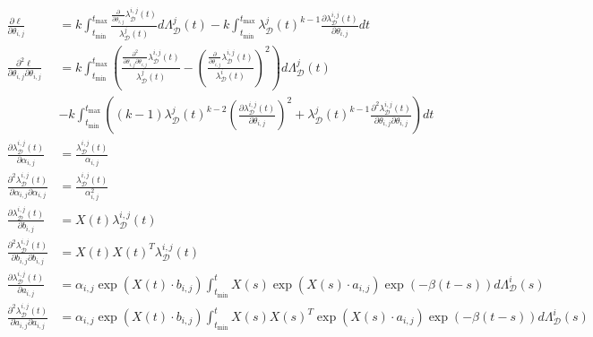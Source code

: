 \documentclass[honours,12pt]{unswthesis}
\numberwithin{equation}{section}
\begin{document}
\begin{equation*}
	\begin{align}
		\frac{\partial\ell}{\partial\theta_{i,j}} &= k\int_{t_\mathrm{min}}^{t_\mathrm{max}} \frac{\frac{\partial}{\partial\theta_{i,j}} \lambda_\mathcal{D}^{i,j}(t)}{\lambda_\mathcal{D}^j(t)}d\Lambda_\mathcal{D}^{j}(t) - k\int_{t_\mathrm{min}}^{t_\mathrm{max}} \lambda_\mathcal{D}^j(t)^{k-1} \frac{\partial \lambda_\mathcal{D}^{i,j}(t)}{\partial \theta_{i,j}} dt \\
		\frac{\partial^2\ell}{\partial\theta_{i,j}\partial\theta_{i,j}} &= k\int_{t_\mathrm{min}}^{t_\mathrm{max}} \left( \frac{\frac{\partial^2}{\partial\theta_{i,j}\partial\theta_{i,j}} \lambda_\mathcal{D}^{i,j}(t)}{\lambda_\mathcal{D}^j(t)} - \left(\frac{\frac{\partial}{\partial\theta_{i,j}}\lambda_\mathcal{D}^{i,j}(t)}{\lambda_\mathcal{D}^i(t)}\right)^2 \right) d\Lambda_\mathcal{D}^{j}(t) \\
		&- k\int_{t_\mathrm{min}}^{t_\mathrm{max}} \left( (k-1)\lambda_\mathcal{D}^j(t)^{k-2} \left(\frac{\partial \lambda_\mathcal{D}^{i,j}(t)}{\partial \theta_{i,j}}\right)^2 + \lambda_\mathcal{D}^j(t)^{k-1} \frac{\partial^2 \lambda_\mathcal{D}^{i,j}(t)}{\partial \theta_{i,j}\partial\theta_{i,j}} \right) dt \\
		\frac{\partial \lambda_\mathcal{D}^{i,j}(t)}{\partial \alpha_{i,j}} &= \frac{\lambda_\mathcal{D}^{i,j}(t)}{\alpha_{i,j}} \\
		\frac{\partial^2 \lambda_\mathcal{D}^{i,j}(t)}{\partial \alpha_{i,j}\partial\alpha_{i,j}} &= \frac{\lambda_\mathcal{D}^{i,j}(t)}{\alpha_{i,j}^2} \\
		\frac{\partial \lambda_\mathcal{D}^{i,j}(t)}{\partial b_{i,j}} &= X(t)\lambda_\mathcal{D}^{i,j}(t) \\
		\frac{\partial^2 \lambda_\mathcal{D}^{i,j}(t)}{\partial b_{i,j}\partial b_{i,j}} &= X(t) X(t)^T \lambda_\mathcal{D}^{i,j}(t) \\
		\frac{\partial \lambda_\mathcal{D}^{i,j}(t)}{\partial a_{i,j}} &= \alpha_{i,j}\exp(X(t)\cdot b_{i,j}) \int_{t_\mathrm{min}}^t X(s) \exp(X(s)\cdot a_{i,j})\exp(-\beta(t-s))d\Lambda_\mathcal{D}^i(s) \\
		\frac{\partial^2 \lambda_\mathcal{D}^{i,j}(t)}{\partial a_{i,j}\partial a_{i,j}} &= \alpha_{i,j}\exp(X(t)\cdot b_{i,j}) \int_{t_\mathrm{min}}^t X(s) X(s)^T \exp(X(s)\cdot a_{i,j})\exp(-\beta(t-s))d\Lambda_\mathcal{D}^i(s) \\
	\end{align}
\end{equation*}
\end{document}
